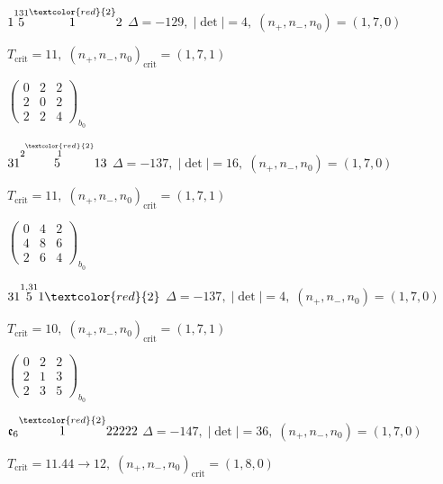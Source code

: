 \documentclass[10pt]{article}
\begin{document}
\smallskip

$1\overset{131}{5}\overset{\textcolor{red}{2}}{1}2$ \quad $\Delta=-129,\; |\det|=4,\; (n_+,n_-,n_0)=(1,7,0)$

\hspace{1em}$T_{\text{crit}}=11,\; (n_+,n_-,n_0)_{\text{crit}}=(1,7,1)$

\hspace{2em}$\left(\begin{smallmatrix}0 & 2 & 2 \\ 2 & 0 & 2 \\ 2 & 2 & 4\end{smallmatrix}\right)_{\!b_0}$

\smallskip

$31\overset{2\overset{\textcolor{red}{2}}{1}}{5}13$ \quad $\Delta=-137,\; |\det|=16,\; (n_+,n_-,n_0)=(1,7,0)$

\hspace{1em}$T_{\text{crit}}=11,\; (n_+,n_-,n_0)_{\text{crit}}=(1,7,1)$

\hspace{2em}$\left(\begin{smallmatrix}0 & 4 & 2 \\ 4 & 8 & 6 \\ 2 & 6 & 4\end{smallmatrix}\right)_{\!b_0}$

\smallskip

$31\overset{1,31}{5}1\textcolor{red}{2}$ \quad $\Delta=-137,\; |\det|=4,\; (n_+,n_-,n_0)=(1,7,0)$

\hspace{1em}$T_{\text{crit}}=10,\; (n_+,n_-,n_0)_{\text{crit}}=(1,7,1)$

\hspace{2em}$\left(\begin{smallmatrix}0 & 2 & 2 \\ 2 & 1 & 3 \\ 2 & 3 & 5\end{smallmatrix}\right)_{\!b_0}$

\smallskip

$\mathfrak{e}_6\overset{\textcolor{red}{2}}{1}22222$ \quad $\Delta=-147,\; |\det|=36,\; (n_+,n_-,n_0)=(1,7,0)$

\hspace{1em}$T_{\text{crit}}=11.44 \to 12,\; (n_+,n_-,n_0)_{\text{crit}}=(1,8,0)$
\end{document}
